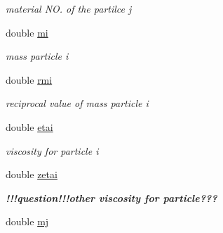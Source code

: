\begin{CompactItemize}
\begin{CompactList}\small\item\em material NO. of the partilce j \item\end{CompactList}\item 
\hypertarget{classInteraction_784e1559dae549bcfd16d610e0f0afc1}{
double \hyperlink{classInteraction_784e1559dae549bcfd16d610e0f0afc1}{mi}}
\label{classInteraction_784e1559dae549bcfd16d610e0f0afc1}

\begin{CompactList}\small\item\em mass particle i \item\end{CompactList}\item 
\hypertarget{classInteraction_4210c5eab19bbba749d449c62cd32dbf}{
double \hyperlink{classInteraction_4210c5eab19bbba749d449c62cd32dbf}{rmi}}
\label{classInteraction_4210c5eab19bbba749d449c62cd32dbf}

\begin{CompactList}\small\item\em reciprocal value of mass particle i \item\end{CompactList}\item 
\hypertarget{classInteraction_9d05f9f756cc060e83df36e6f4a91916}{
double \hyperlink{classInteraction_9d05f9f756cc060e83df36e6f4a91916}{etai}}
\label{classInteraction_9d05f9f756cc060e83df36e6f4a91916}

\begin{CompactList}\small\item\em viscosity for particle i \item\end{CompactList}\item 
\hypertarget{classInteraction_5894b29fda10089be87da2c66e600843}{
double \hyperlink{classInteraction_5894b29fda10089be87da2c66e600843}{zetai}}
\label{classInteraction_5894b29fda10089be87da2c66e600843}

\begin{CompactList}\small\item\em {\bf !!!question!!!{\bf other viscosity for particle??? }}\item\end{CompactList}\item 
\hypertarget{classInteraction_0c96b05bcc1f55aa3c095dd483478159}{
double \hyperlink{classInteraction_0c96b05bcc1f55aa3c095dd483478159}{mj}}
\label{classInteraction_0c96b05bcc1f55aa3c095dd483478159}


\end{CompactItemize}
